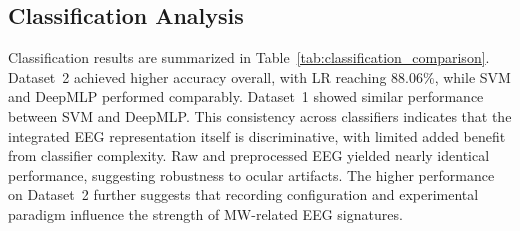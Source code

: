 \documentclass[conference]{IEEEtran}
\begin{document}
\subsection{Classification Analysis}
Classification results are summarized in Table~\ref{tab:classification_comparison}. Dataset~2 achieved higher accuracy overall, with LR reaching $88.06\%$, while SVM and DeepMLP performed comparably. Dataset~1 showed similar performance between SVM and DeepMLP. This consistency across classifiers indicates that the integrated EEG representation itself is discriminative, with limited added benefit from classifier complexity. Raw and preprocessed EEG yielded nearly identical performance, suggesting robustness to ocular artifacts. The higher performance on Dataset~2 further suggests that recording configuration and experimental paradigm influence the strength of MW-related EEG signatures.
\begin{table}[h]
\centering
\caption{Classification performance on Dataset~1 and Dataset~2.}
\label{tab:classification_comparison}
\end{table}
\end{document}

